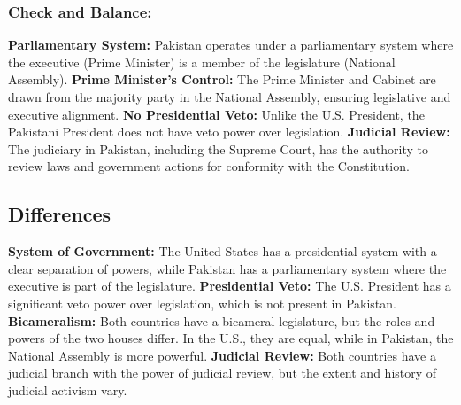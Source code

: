 \documentclass{article}
\begin{document}
\subsubsection{Check and Balance:}
\textbf{Parliamentary System:} Pakistan operates under a parliamentary system where the executive (Prime Minister) is a member of the legislature (National Assembly).
\newline
\textbf{Prime Minister's Control:} The Prime Minister and Cabinet are drawn from the majority party in the National Assembly, ensuring legislative and executive alignment.
\newline
\textbf{No Presidential Veto:} Unlike the U.S. President, the Pakistani President does not have veto power over legislation.
\newline
\textbf{Judicial Review:} The judiciary in Pakistan, including the Supreme Court, has the authority to review laws and government actions for conformity with the Constitution.

\subsection{Differences}
\textbf{System of Government:} The United States has a presidential system with a clear separation of powers, while Pakistan has a parliamentary system where the executive is part of the legislature.
\newline
\textbf{Presidential Veto:} The U.S. President has a significant veto power over legislation, which is not present in Pakistan.
\newline
\textbf{Bicameralism:} Both countries have a bicameral legislature, but the roles and powers of the two houses differ. In the U.S., they are equal, while in Pakistan, the National Assembly is more powerful.
\newline
\textbf{Judicial Review:} Both countries have a judicial branch with the power of judicial review, but the extent and history of judicial activism vary.
\end{document}
